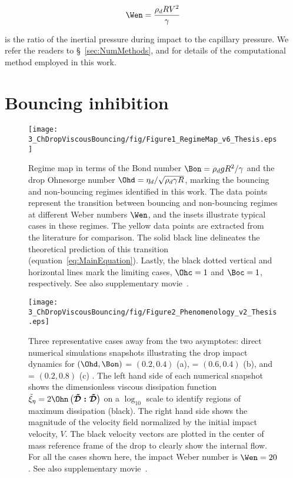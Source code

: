 \begin{align}
	\Wen = \frac{\rho_d R V^2}{\gamma}
\end{align}

\noindent is the ratio of the inertial pressure during impact to the capillary pressure. We refer the readers to \S~\ref{sec:NumMethods}, and \citet{popinet2009accurate, popinet2015quadtree, basiliskpopinet1, zhang2022impact, basiliskVatsalViscousBouncing} for details of the computational method employed in this work.

\section{Bouncing inhibition}
\label{sec:bouncingInhibition}
\begin{figure}
	\centering
	\texttt{[image: 3\_ChDropViscousBouncing/fig/Figure1\_RegimeMap\_v6\_Thesis.eps]}
	\caption{Regime map in terms of the Bond number $\Bon = \rho_dgR^2/\gamma$ and the drop Ohnesorge number $\Ohd = \eta_d/\sqrt{\rho_d\gamma R}$, marking the bouncing and non-bouncing regimes identified in this work. The data points represent the transition between bouncing and non-bouncing regimes at different Weber numbers $\Wen$, and the insets illustrate typical cases in these regimes. The yellow data points are extracted from the literature for comparison. The solid black line delineates the theoretical prediction of this transition (equation~\eqref{eq:MainEquation}). Lastly, the black dotted vertical and horizontal lines mark the limiting cases, $\Ohc = 1$ and $\Boc = 1$, respectively. See also supplementary movie~.}
	\label{fig:RegimeMap}
\end{figure}
\begin{sidewaysfigure}
	\centering
	\texttt{[image: 3\_ChDropViscousBouncing/fig/Figure2\_Phenomenology\_v2\_Thesis.eps]}
	\caption{Three representative cases away from the two asymptotes: direct numerical simulations snapshots illustrating the drop impact dynamics for $\left(\Ohd, \Bon\right)$ = $\left(0.2, 0.4\right)$ (a), = $\left(0.6, 0.4\right)$ (b), and = $\left(0.2, 0.8\right)$ (c) . The left hand side of each numerical snapshot shows the dimensionless viscous dissipation function $\tilde{\xi}_\eta = 2\Ohn\left(\boldsymbol{\tilde{\mathcal{D}}:\tilde{\mathcal{D}}}\right)$ on a $\log_{10}$ scale to identify regions of maximum dissipation (black). The right hand side shows the magnitude of the velocity field normalized by the initial impact velocity, $V$. The black velocity vectors are plotted in the center of mass reference frame of the drop to clearly show the internal flow. For all the cases shown here, the impact Weber number is $\Wen = 20$. See also supplementary movie~.}
	\label{fig:Phenomenology}
\end{sidewaysfigure}

